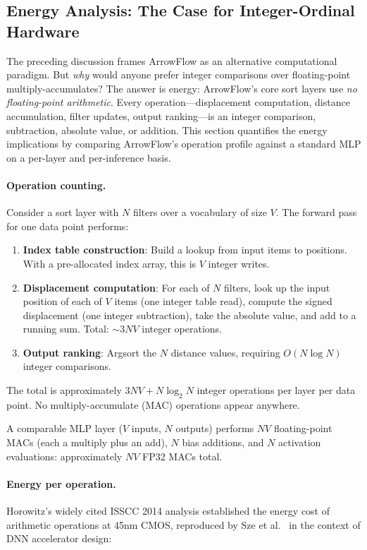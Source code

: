 \documentclass[12pt]{article}
\begin{document}
\subsection{Energy Analysis: The Case for Integer-Ordinal Hardware}
\label{sec:energy}

The preceding discussion frames ArrowFlow as an alternative computational paradigm. But \emph{why} would anyone prefer integer comparisons over floating-point multiply-accumulates? The answer is energy: ArrowFlow's core sort layers use \emph{no floating-point arithmetic}. Every operation---displacement computation, distance accumulation, filter updates, output ranking---is an integer comparison, subtraction, absolute value, or addition. This section quantifies the energy implications by comparing ArrowFlow's operation profile against a standard MLP on a per-layer and per-inference basis.

\paragraph{Operation counting.}
Consider a sort layer with $N$ filters over a vocabulary of size $V$. The forward pass for one data point performs:

\begin{enumerate}[leftmargin=2em]
  \item \textbf{Index table construction}: Build a lookup from input items to positions. With a pre-allocated index array, this is $V$ integer writes.
  \item \textbf{Displacement computation}: For each of $N$ filters, look up the input position of each of $V$ items (one integer table read), compute the signed displacement (one integer subtraction), take the absolute value, and add to a running sum. Total: $\sim 3NV$ integer operations.
  \item \textbf{Output ranking}: Argsort the $N$ distance values, requiring $O(N \log N)$ integer comparisons.
\end{enumerate}

The total is approximately $3NV + N\log_2 N$ integer operations per layer per data point. No multiply-accumulate (MAC) operations appear anywhere.

A comparable MLP layer ($V$ inputs, $N$ outputs) performs $NV$ floating-point MACs (each a multiply plus an add), $N$ bias additions, and $N$ activation evaluations: approximately $NV$ FP32 MACs total.

\paragraph{Energy per operation.}
Horowitz's widely cited ISSCC 2014 analysis \citep{horowitz2014energy} established the energy cost of arithmetic operations at 45nm CMOS, reproduced by Sze et al.\ \citep{sze2017efficient} in the context of DNN accelerator design:
\end{document}
